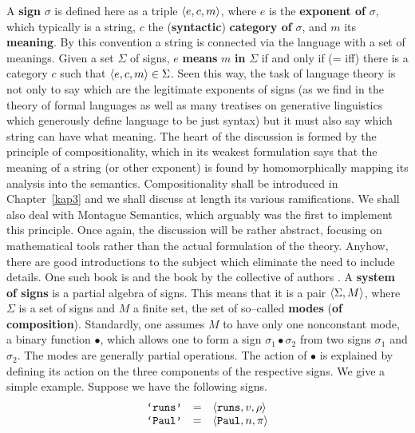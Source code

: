 A \textbf{sign} $\sigma$ is defined here as a triple $\langle e, c, m\rangle$,
where $e$ is the \textbf{exponent of} $\sigma$, which typically is
a string, $c$ the (\textbf{syntactic}) \textbf{category of} $\sigma$, 
and $m$ its \textbf{meaning}. By this convention a string is connected
via the language with a set of meanings. Given a set $\Sigma$ of signs, 
$e$ \textbf{means} $m$ \textbf{in} $\Sigma$ if and only if (= iff) 
there is a category $c$ such that $\langle e,c,m\rangle \in \Sigma$. Seen 
this way, the task of language theory is not only to say which are 
the legitimate exponents of signs (as we find in the theory of
formal languages as well as many treatises on generative
linguistics which generously define language to be just syntax)
but it must also say which string can have what meaning.
The heart of the discussion is formed by the principle of
compositionality,
which in its weakest formulation says that the meaning of a
string (or other exponent) is found by homomorphically mapping
its analysis into the semantics. Compositionality shall be
introduced in Chapter~\ref{kap3} and we shall discuss at
length its various ramifications. We shall also deal with
Montague Semantics, which arguably was the first to 
implement this principle. Once again, the discussion will be
rather abstract, focusing on mathematical tools rather than
the actual formulation of the theory. Anyhow, there are good
introductions to the subject which eliminate the need to
include details. One such book is \cite{dowtywallpeters} and 
the book by the collective of authors \cite{gamut:teil2}.
\nocite{gamut:teil1}
A \textbf{system of signs} is a partial algebra of signs.
This means that it is a pair $\langle \Sigma, M\rangle$,
where $\Sigma$ is a set of signs and $M$  a finite set,
the set of so--called \textbf{modes} (\textbf{of composition}).
Standardly, one assumes $M$ to have only one nonconstant mode, 
a binary function $\bullet$, which allows one to form a sign
$\sigma_1 \bullet \sigma_2$ from two signs $\sigma_1$ and
$\sigma_2$. The modes are generally partial operations.
The action of $\bullet$ is explained by defining its
action on the three components of the respective signs.
We give a simple example. Suppose we have the following
signs.
$$\begin{array}{l@{\quad = \quad}l}
\mbox{\tt `runs'} & \auf \mbox{\tt runs}, v, \rho\zu \\
\mbox{\tt `Paul'} & \auf \mbox{\tt Paul}, n, \pi\zu
\end{array}$$
